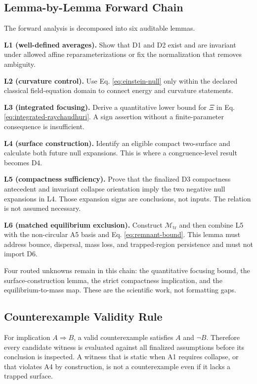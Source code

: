 \documentclass[conference]{IEEEtran}
\begin{document}
\subsection{Lemma-by-Lemma Forward Chain}
The forward analysis is decomposed into six auditable lemmas.

\textbf{L1 (well-defined averages).} Show that D1 and D2 exist and are invariant under allowed affine reparameterizations or fix the normalization that removes ambiguity.

\textbf{L2 (curvature control).} Use Eq. \eqref{eq:einstein-null} only within the declared classical field-equation domain to connect energy and curvature statements.

\textbf{L3 (integrated focusing).} Derive a quantitative lower bound for $\Xi$ in Eq. \eqref{eq:integrated-raychaudhuri}. A sign assertion without a finite-parameter consequence is insufficient.

\textbf{L4 (surface construction).} Identify an eligible compact two-surface and calculate both future null expansions. This is where a congruence-level result becomes D4.

\textbf{L5 (compactness sufficiency).} Prove that the finalized D3 compactness antecedent and invariant collapse orientation imply the two negative null expansions in L4. Those expansion signs are conclusions, not inputs. The relation is not assumed necessary.

\textbf{L6 (matched equilibrium exclusion).} Construct $\mathcal{M}_{\mathrm{tr}}$ and then combine L5 with the non-circular A5 basis and Eq. \eqref{eq:remnant-bound}. This lemma must address bounce, dispersal, mass loss, and trapped-region persistence and must not import D6.

Four routed unknowns remain in this chain: the quantitative focusing bound, the surface-construction lemma, the strict compactness implication, and the equilibrium-to-mass map. These are the scientific work, not formatting gaps.

\subsection{Counterexample Validity Rule}
For implication $A\Rightarrow B$, a valid counterexample satisfies $A$ and $\neg B$. Therefore every candidate witness is evaluated against all finalized assumptions before its conclusion is inspected. A witness that is static when A1 requires collapse, or that violates A4 by construction, is not a counterexample even if it lacks a trapped surface.
\end{document}
